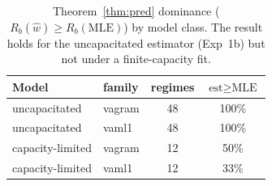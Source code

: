 \begin{table}[htbp]
\centering
\caption{Theorem~\ref{thm:pred} dominance ($R_b(\hat w) \ge R_b(\text{MLE})$) by model class. The result holds for the uncapacitated estimator (Exp~1b) but not under a finite-capacity fit.}
\label{tab:scope}
\begin{tabular}{llcc}
\toprule
Model & family & regimes & $\text{est} \ge \text{MLE}$ \\
\midrule
uncapacitated & vagram & 48 & 100\% \\
uncapacitated & vaml1 & 48 & 100\% \\
capacity-limited & vagram & 12 & 50\% \\
capacity-limited & vaml1 & 12 & 33\% \\
\bottomrule
\end{tabular}
\end{table}
